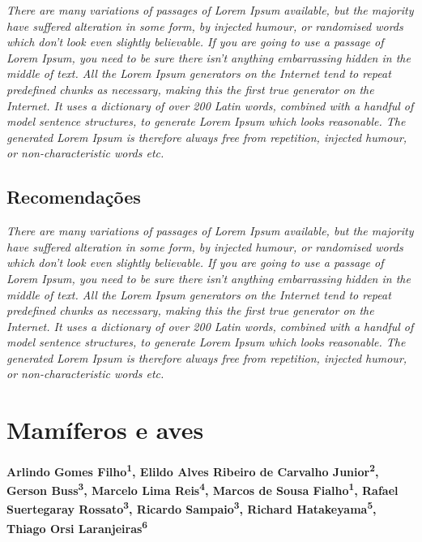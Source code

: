 \documentclass[
  letterpaper,
]{scrbook}
\begin{document}
\emph{There are many variations of passages of Lorem Ipsum available,
but the majority have suffered alteration in some form, by injected
humour, or randomised words which don't look even slightly believable.
If you are going to use a passage of Lorem Ipsum, you need to be sure
there isn't anything embarrassing hidden in the middle of text. All the
Lorem Ipsum generators on the Internet tend to repeat predefined chunks
as necessary, making this the first true generator on the Internet. It
uses a dictionary of over 200 Latin words, combined with a handful of
model sentence structures, to generate Lorem Ipsum which looks
reasonable. The generated Lorem Ipsum is therefore always free from
repetition, injected humour, or non-characteristic words etc.}

\section{Recomendações}\label{recomendauxe7uxf5es-1}

\emph{There are many variations of passages of Lorem Ipsum available,
but the majority have suffered alteration in some form, by injected
humour, or randomised words which don't look even slightly believable.
If you are going to use a passage of Lorem Ipsum, you need to be sure
there isn't anything embarrassing hidden in the middle of text. All the
Lorem Ipsum generators on the Internet tend to repeat predefined chunks
as necessary, making this the first true generator on the Internet. It
uses a dictionary of over 200 Latin words, combined with a handful of
model sentence structures, to generate Lorem Ipsum which looks
reasonable. The generated Lorem Ipsum is therefore always free from
repetition, injected humour, or non-characteristic words etc.}


\chapter{Mamíferos e aves}\label{mamuxedferos-e-aves}

\textbf{Arlindo Gomes Filho\textsuperscript{1}, Elildo Alves Ribeiro de
Carvalho Junior\textsuperscript{2}, Gerson Buss\textsuperscript{3},
Marcelo Lima Reis\textsuperscript{4}, Marcos de Sousa
Fialho\textsuperscript{1}, Rafael Suertegaray
Rossato\textsuperscript{3}, Ricardo Sampaio\textsuperscript{3}, Richard
Hatakeyama\textsuperscript{5}, Thiago Orsi
Laranjeiras\textsuperscript{6}}
\end{document}
